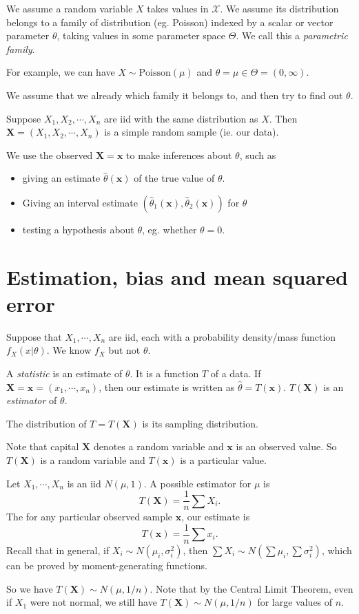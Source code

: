 \documentclass[a4paper]{article}
\begin{document}
We assume a random variable $X$ takes values in $\mathcal{X}$. We assume its distribution belongs to a family of distribution (eg. Poisson) indexed by a scalar or vector parameter $\theta$, taking values in some parameter space $\Theta$. We call this a \emph{parametric family}.

For example, we can have $X\sim \text{Poisson}(\mu)$ and $\theta = \mu\in\Theta = (0, \infty)$.

We assume that we already which family it belongs to, and then try to find out $\theta$.

Suppose $X_1, X_2, \cdots, X_n$ are iid with the same distribution as $X$. Then $\mathbf{X} = (X_1, X_2, \cdots, X_n)$ is a simple random sample (ie. our data).

We use the observed $\mathbf{X} = \mathbf{x}$ to make inferences about $\theta$, such as
\begin{itemize}
  \item giving an estimate $\hat{\theta}(\mathbf{x})$ of the true value of $\theta$.
  \item Giving an interval estimate $(\hat{\theta}_1(\mathbf{x}), \hat{\theta}_2(\mathbf{x}))$ for $\theta$
  \item testing a hypothesis about $\theta$, eg. whether $\theta = 0$.
\end{itemize}
\section{Estimation, bias and mean squared error}
Suppose that $X_1, \cdots, X_n$ are iid, each with a probability density/mass function $f_X(x|\theta)$. We know $f_X$ but not $\theta$.

\begin{defi}[Statistic]
  A \emph{statistic} is an estimate of $\theta$. It is a function $T$ of a data. If $\mathbf{X} = \mathbf{x} = (x_1, \cdots, x_n)$, then our estimate is written as $\hat{\theta} = T(\mathbf{x})$. $T(\mathbf{X})$ is an \emph{estimator} of $\theta$.

  The distribution of $T = T(\mathbf{X})$ is its sampling distribution.

  Note that capital $\mathbf{X}$ denotes a random variable and $\mathbf{x}$ is an observed value. So $T(\mathbf{X})$ is a random variable and $T(\mathbf{x})$ is a particular value.
\end{defi}

\begin{eg}
  Let $X_1, \cdots, X_n$ is an iid $N(\mu, 1)$. A possible estimator for $\mu$ is
  \[
    T(\mathbf{X}) = \frac{1}{n}\sum X_i.
  \]
  The for any particular observed sample $\mathbf{x}$, our estimate is
  \[
    T(\mathbf{x}) = \frac{1}{n}\sum x_i.
  \]
  Recall that in general, if $X_i \sim N(\mu_i, \sigma_i^2)$, then $\sum X_i \sim N(\sum \mu_i, \sum \sigma_i^2)$, which can be proved by moment-generating functions.
  
  So we have $T(\mathbf{X})\sim N(\mu, 1/n)$. Note that by the Central Limit Theorem, even if $X_1$ were not normal, we still have $T(\mathbf{X})\sim N(\mu, 1/n)$ for large values of $n$.
\end{eg}
\end{document}
